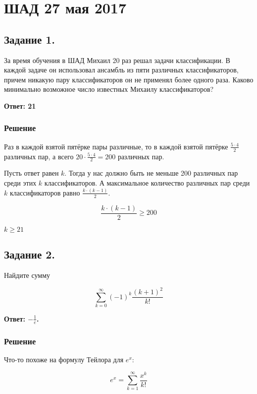 \documentclass[a4paper]{article}
\author{Васильев Павел}
\begin{document}
\section*{ШАД 27 мая 2017}

\subsection*{Задание 1.}

За время обучения в ШАД Михаил 20 раз решал задачи классификации. В каждой задаче он использовал ансамбль из пяти различных классификаторов, причем никакую пару классификаторов он не применял более одного раза. Каково минимально возможное число известных Михаилу классификаторов?

\textbf{Ответ: 21}

\subsubsection*{Решение}


Раз в каждой взятой пятёрке пары различные, то в каждой взятой пятёрке $\frac{5 \cdot 4}{2}$ различных пар, а всего $20 \cdot \frac{5 \cdot 4}{2} = 200$ различных пар.

Пусть ответ равен $k$. Тогда у нас должно быть не меньше 200 различных пар среди этих $k$ классификаторов. А максимальное количество различных пар среди $k$ классификаторов равно $\frac{k \cdot (k-1)}{2}$.

\[ 
\frac{k \cdot (k-1)}{2} \geq 200
\]

$k \geq 21 $

\subsection*{Задание 2.}

Найдите сумму

\[ \sum_{k=0}^\infty (-1)^k \frac{(k+1)^2}{k!} \]


\textbf{Ответ: $-\frac{1}{e}$.}

\subsubsection*{Решение}


Что-то похоже на формулу Тейлора для $e^x$:

\[ e^x = \sum_{k=1}^\infty \frac{x^k}{k!} \]
\end{document}
